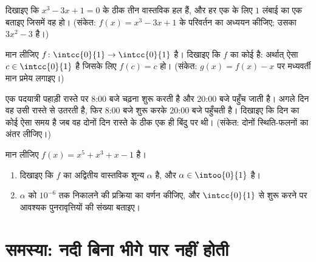 \begin{exercise}[$\star\star$]\label{exo:g12:limcont:6}
दिखाइए कि  $x^3 - 3x + 1 = 0$ के ठीक तीन वास्तविक हल हैं, और हर एक के लिए $1$
लंबाई का एक  बताइए जिसमें वह हो। (संकेत: $f(x) = x^3 - 3x + 1$ के परिवर्तन का अध्ययन
कीजिए; उसका  $3x^2 - 3$ है।)
\end{exercise}

\begin{exercise}[$\star\star$]\label{exo:g12:limcont:7}
मान लीजिए $f \colon \intcc{0}{1} \to \intcc{0}{1}$  है। दिखाइए कि $f$ का कोई \emph{} है:
अर्थात् ऐसा $c \in \intcc{0}{1}$ है जिसके लिए $f(c) = c$ हो। (संकेत: $g(x) = f(x) - x$ पर मध्यवर्ती मान
प्रमेय लगाइए।)
\end{exercise}

\begin{exercise}[$\star\star\star$]\label{exo:g12:limcont:8}
एक पदयात्री पहाड़ी रास्ते पर 8:00 बजे चढ़ना शुरू करती है और 20:00 बजे पहुँच
जाती है। अगले दिन वह उसी रास्ते से उतरती है, फिर 8:00 बजे शुरू करके 20:00 बजे
पहुँचती है। दिखाइए कि दिन का कोई ऐसा समय है जब वह दोनों दिन रास्ते के ठीक एक
ही बिंदु पर थी। (संकेत: दोनों स्थिति-फलनों का अंतर लीजिए।)
\end{exercise}

\begin{exercise}[$\star\star\star$]\label{exo:g12:limcont:9}
मान लीजिए $f(x) = x^5 + x^3 + x - 1$ है।
\begin{enumerate}
  \item दिखाइए कि $f$ का अद्वितीय वास्तविक शून्य $\alpha$ है, और $\alpha \in \intoo{0}{1}$ है।
  \item $\alpha$ को $10^{-6}$ तक निकालने की  प्रक्रिया का वर्णन कीजिए, और
        $\intcc{0}{1}$ से शुरू करने पर आवश्यक पुनरावृत्तियों की संख्या बताइए।
\end{enumerate}
\end{exercise}

\section{समस्या: नदी बिना भीगे पार नहीं होती}

